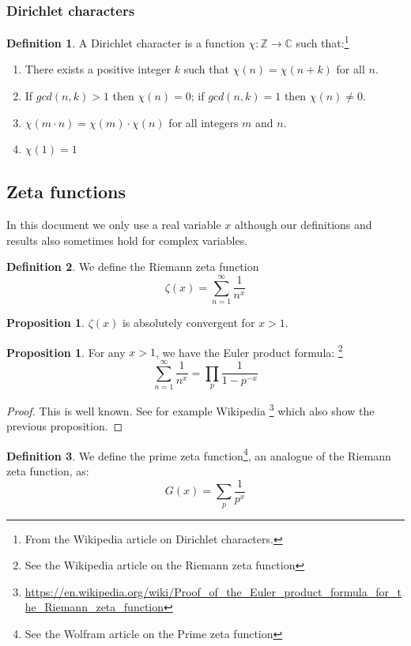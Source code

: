 \documentclass{article}
\theoremstyle{definition}
\newtheorem{definition}{Definition}[section]
\newtheorem{proposition}[theorem]{Proposition}
\theoremstyle{remark}
\begin{document}
\subsubsection{Dirichlet characters}
\begin{definition}
A Dirichlet character is a function $\chi:\mathbb{Z}\rightarrow \mathbb{C}$
 such that:\footnote{From the Wikipedia article on Dirichlet characters.}

 \begin{enumerate}
 \item There exists a positive integer $k$ such that $\chi(n) = \chi(n + k)$ for all $n$.
 \item If $gcd(n,k) > 1$ then $\chi(n) = 0$; if $gcd(n,k) = 1$ then $\chi(n) \neq 0$.
 \item $\chi(m\cdot n) = \chi (m) \cdot \chi (n)$ for all integers $m$ and $n$.
\item $\chi(1)=1$
\end{enumerate}
\end{definition}

\subsection{Zeta functions}

In this document we only use a real variable $x$ although our definitions and results also sometimes hold for complex variables.
\begin{definition} \label{defRiemannZeta}
We define the Riemann zeta function
$$\zeta(x)=\sum_{n=1}^{\infty}\frac{1}{n^x}$$
\end{definition}
\begin{proposition}
$\zeta(x)$ is absolutely convergent for $x>1$.
\end{proposition}
\begin{proposition}
For any $x > 1$, we have the Euler product formula: \footnote{See the Wikipedia article on the Riemann zeta function}
$$\sum_{n=1}^{\infty}\frac{1}{n^x}=\prod_p\frac{1}{1-p^{-x}}$$
\end{proposition}
\begin{proof}
This is well known. See for example Wikipedia \footnote{\url{https://en.wikipedia.org/wiki/Proof_of_the_Euler_product_formula_for_the_Riemann_zeta_function}} which also show the previous proposition.
\end{proof}
\begin{definition} \label{defPrime_Zeta}
We define the prime zeta function\footnote{See the Wolfram article on the Prime zeta function}, an analogue of the Riemann zeta function, as:
$$G(x)=\sum_p \frac{1}{p^{x}}$$
\end{definition}
\end{document}
